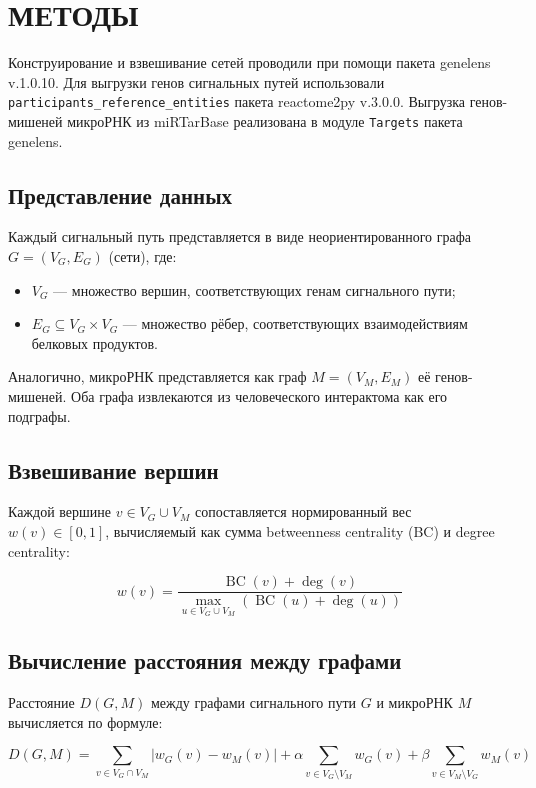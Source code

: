 \section{МЕТОДЫ}

Конструирование и взвешивание сетей проводили при помощи пакета genelens v.1.0.10. Для выгрузки генов сигнальных путей использовали \texttt{participants\_reference\_entities} пакета reactome2py v.3.0.0. Выгрузка генов-мишеней микроРНК из miRTarBase реализована в модуле \texttt{Targets} пакета genelens.

\subsection{Представление данных}
Каждый сигнальный путь представляется в виде неориентированного графа $G = (V_G, E_G)$ (сети), где:
\begin{itemize}
    \item $V_G$ --- множество вершин, соответствующих генам сигнального пути;
    \item $E_G \subseteq V_G \times V_G$ --- множество рёбер, соответствующих взаимодействиям белковых продуктов.
\end{itemize}

Аналогично, микроРНК представляется как граф $M = (V_M, E_M)$ её генов-мишеней. Оба графа извлекаются из человеческого интерактома как его подграфы.

\subsection{Взвешивание вершин}
Каждой вершине $v \in V_G \cup V_M$ сопоставляется нормированный вес $w(v) \in [0,1]$, вычисляемый как сумма betweenness centrality (BC) и degree centrality:

\begin{equation}
w(v) = \frac{\operatorname{BC}(v) + \deg(v)}{\max_{u \in V_G \cup V_M} (\operatorname{BC}(u) + \deg(u))}
\end{equation}

\subsection{Вычисление расстояния между графами}
Расстояние $D(G,M)$ между графами сигнального пути $G$ и микроРНК $M$ вычисляется по формуле:

\begin{equation}
D(G,M) = \sum_{v \in V_G \cap V_M} |w_G(v) - w_M(v)| + \alpha \sum_{v \in V_G \setminus V_M} w_G(v) + \beta \sum_{v \in V_M \setminus V_G} w_M(v)
\label{eq:optim_task}
\end{equation}

